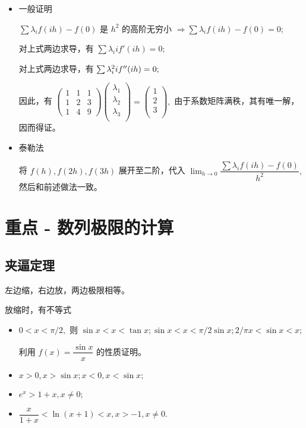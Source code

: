 \begin{itemize}
    \item 一般证明
    
    $ \sum \lambda_if(ih) - f(0) $ 是 $ h^2 $ 的高阶无穷小 $ \Rightarrow \sum \lambda_if(ih) - f(0) = 0; $ 

    对上式两边求导，有 $ \sum \lambda_i if'(ih) = 0; $ 

    对上式两边求导，有 $ \sum \lambda_i^2 if^{\prime\prime}(ih) = 0; $ 

    因此，有 $ \begin{pmatrix}
        1&1&1\\ 1&2&3\\ 1&4&9
    \end{pmatrix}\begin{pmatrix}
        \lambda_1 \\
        \lambda_2 \\
        \lambda_3 \\
    \end{pmatrix} = 
    \begin{pmatrix}
        1 \\
        2 \\
        3 \\
    \end{pmatrix}, $ 由于系数矩阵满秩，其有唯一解，因而得证。
    \item 泰勒法
    
    将 $ f(h),f(2h),f(3h) $ 展开至二阶，代入
    $ {\displaystyle\lim_{h\rightarrow 0}}\dfrac{\sum \lambda_i f(ih) - f(0)}{h^2}, $ 
    然后和前述做法一致。
\end{itemize}

\section{重点 - 数列极限的计算}

\subsection{夹逼定理}

左边缩，右边放，两边极限相等。

放缩时，有不等式

\begin{itemize}
    \item $ 0<x<\pi/2, $ 则 $ \sin x<x<\tan x;
    \sin x < x < \pi/2 \sin x; 2/\pi x < \sin x < x; $ 
    
    利用 $ f(x) = \dfrac{\sin x}{x} $ 的性质证明。
    \item $ x > 0, x > \sin x; x < 0, x < \sin x; $ 
    \item $ e^x > 1 + x, x\neq 0; $ 
    \item $ \dfrac{x}{1+x}< \ln (x+1)< x, x > -1, x \neq 0. $ 
\end{itemize}

